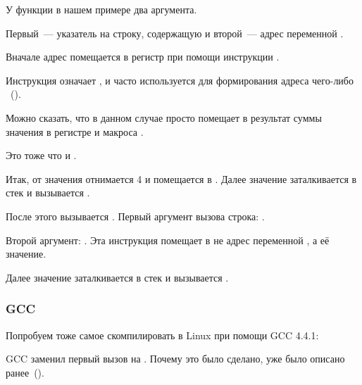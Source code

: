 У функции \scanf в нашем примере два аргумента.

Первый~--- указатель на строку, содержащую  и второй~--- адрес переменной .

Вначале адрес  помещается в регистр \EAX при помощи инструкции .

Инструкция \LEA означает , и часто используется для формирования адреса чего-либо ~().

Можно сказать, что в данном случае \LEA просто помещает в \EAX результат суммы значения в регистре \EBP и макроса .

Это тоже что и .

Итак, от значения \EBP отнимается 4 и помещается в \EAX.
Далее значение \EAX заталкивается в стек и вызывается \scanf.

После этого вызывается \printf. Первый аргумент вызова строка:
.

Второй аргумент: .
Эта инструкция помещает в \ECX не адрес переменной , а её значение.

Далее значение \ECX заталкивается в стек и вызывается \printf.

\ifdefined\IncludeOlly

\fi

\ifdefined\IncludeGCC
\subsubsection{GCC}

Попробуем тоже самое скомпилировать в Linux при помощи GCC 4.4.1:



GCC заменил первый вызов \printf на \puts. Почему это было сделано, 
уже было описано ранее~().

% 


